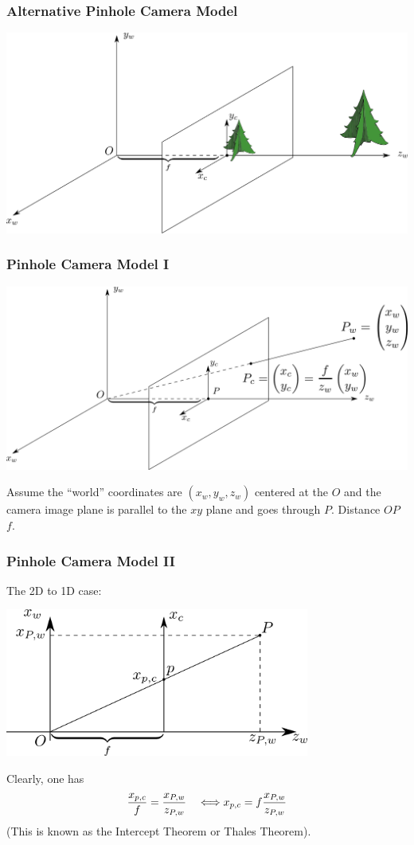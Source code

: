 \documentclass[10pt]{beamer}
\newcommand{\myemph}[1]{{\color{blue}{#1}}}
\begin{document}
\begin{frame}
  \frametitle{Alternative Pinhole Camera Model}
  \vfill
  \begin{center}
    \includegraphics[width=\textwidth]{FIGURES/pinholecamera_alt}
  \end{center}
  \vfill
\end{frame}


\begin{frame}
  \frametitle{Pinhole Camera Model I}
  \begin{center}
    \includegraphics[width=\textwidth]{FIGURES/pinholecamera}
  \end{center}
  Assume the ``world'' coordinates are $(x_w,y_w,z_w)$ centered at the \myemph{aperture point} $O$ and the camera image plane is
  parallel to the $xy$ plane and goes through $P$. Distance $OP$ \myemph{focal
    length} $f$.
\end{frame}

\begin{frame}
  \frametitle{Pinhole Camera Model II}
  The 2D to 1D case:
  \begin{center}
    \includegraphics[width=0.75\textwidth]{FIGURES/pinholecamera1D}
  \end{center}
  
  Clearly, one has 
  $$
  \frac{x_{p,c}}{f} = \frac{x_{P,w}}{z_{P,w}}\quad\Longleftrightarrow x_{p,c} = f\frac{x_{P,w}}{z_{P,w}}
  $$
  (This is known as the Intercept Theorem or Thales Theorem). 
\end{frame}
\end{document}
